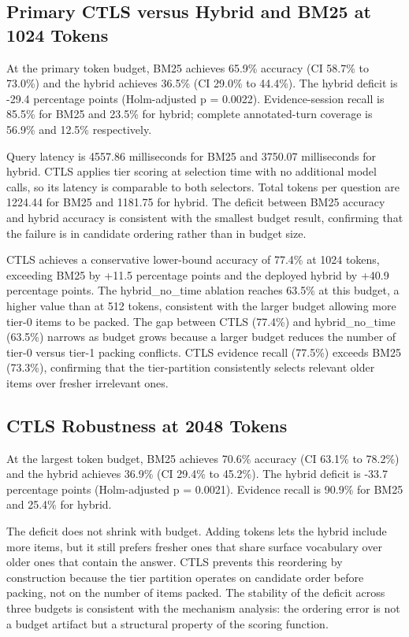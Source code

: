 \subsection{Primary CTLS versus Hybrid and BM25 at 1024 Tokens}

\label{sec:result_fair_baselines}

At the primary token budget, BM25 achieves 65.9\% accuracy (CI 58.7\% to 73.0\%) and the hybrid achieves 36.5\% (CI 29.0\% to 44.4\%). The hybrid deficit is -29.4 percentage points (Holm-adjusted p = 0.0022). Evidence-session recall is 85.5\% for BM25 and 23.5\% for hybrid; complete annotated-turn coverage is 56.9\% and 12.5\% respectively.

Query latency is 4557.86 milliseconds for BM25 and 3750.07 milliseconds for hybrid. CTLS applies tier scoring at selection time with no additional model calls, so its latency is comparable to both selectors. Total tokens per question are 1224.44 for BM25 and 1181.75 for hybrid. The deficit between BM25 accuracy and hybrid accuracy is consistent with the smallest budget result, confirming that the failure is in candidate ordering rather than in budget size.

CTLS achieves a conservative lower-bound accuracy of 77.4\% at 1024 tokens, exceeding BM25 by +11.5 percentage points and the deployed hybrid by +40.9 percentage points. The hybrid\_no\_time ablation reaches 63.5\% at this budget, a higher value than at 512 tokens, consistent with the larger budget allowing more tier-0 items to be packed. The gap between CTLS (77.4\%) and hybrid\_no\_time (63.5\%) narrows as budget grows because a larger budget reduces the number of tier-0 versus tier-1 packing conflicts. CTLS evidence recall (77.5\%) exceeds BM25 (73.3\%), confirming that the tier-partition consistently selects relevant older items over fresher irrelevant ones.

\subsection{CTLS Robustness at 2048 Tokens}

\label{sec:result_protocol_replication}

At the largest token budget, BM25 achieves 70.6\% accuracy (CI 63.1\% to 78.2\%) and the hybrid achieves 36.9\% (CI 29.4\% to 45.2\%). The hybrid deficit is -33.7 percentage points (Holm-adjusted p = 0.0021). Evidence recall is 90.9\% for BM25 and 25.4\% for hybrid.

The deficit does not shrink with budget. Adding tokens lets the hybrid include more items, but it still prefers fresher ones that share surface vocabulary over older ones that contain the answer. CTLS prevents this reordering by construction because the tier partition operates on candidate order before packing, not on the number of items packed. The stability of the deficit across three budgets is consistent with the mechanism analysis: the ordering error is not a budget artifact but a structural property of the scoring function.

